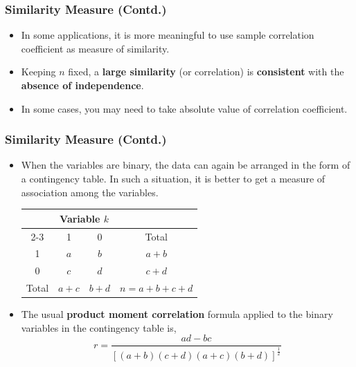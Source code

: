 \documentclass[10pt]{beamer} %
\begin{document}
\begin{frame}
   \frametitle{Similarity Measure (Contd.)}
   \begin{itemize}
      \item In some applications, it is more meaningful to use sample
         correlation coefficient as measure of similarity.
      \item
         Keeping $n$ fixed, a \textbf{large similarity} (or correlation) is
         \textbf{consistent} with the \textbf{absence of independence}.  
      \item In some cases, you may need to take absolute value of correlation
         coefficient.
   \end{itemize}
\end{frame}

\begin{frame}
   \frametitle{Similarity Measure (Contd.)}
   \begin{itemize}
      \item When the variables are binary, the data can again be arranged in the
         form of a contingency table. In such a situation, it is better to get a
         measure of association among the variables.
         \begin{center}\small
            \begin{tabular}{|c|cc|c|}
               \toprule 
               {} &  \multicolumn{2}{c|}{Variable $k$} & \\ 
               \cmidrule{2-3} 
               \multirow{-2.5}{*}{Variable $i$}  & {1} & {0} & Total\\ 
               \midrule 
               1 & $a$ & $b$ & $a + b$ \\[-2mm]
               0 & $c$ & $d$ & $c + d$ \\
               \bottomrule 
               Total & $a + c$  & $b + d$ & $n = a + b +c + d$ \\
               \bottomrule 
            \end{tabular} 
         \end{center}
      \item The usual \textbf{product moment correlation} formula applied to the
         binary variables in the contingency table is,
         \begin{equation*}
            r=\frac{ad-bc}{\left[(a+b)(c+d)(a+c)(b+d)\right]^{\frac{1}{2}}}
         \end{equation*}
   \end{itemize}
\end{frame}
\end{document}
